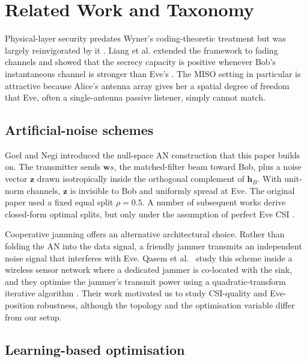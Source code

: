 \documentclass[conference]{IEEEtran}
\begin{document}
\section{Related Work and Taxonomy}\label{sec:related}

Physical-layer security predates Wyner's coding-theoretic treatment but
was largely reinvigorated by it \cite{wyner1975wiretap}. Liang et al.
extended the framework to fading channels and showed that the secrecy
capacity is positive whenever Bob's instantaneous channel is stronger
than Eve's \cite{liang2008secure}. The MISO setting in particular is
attractive because Alice's antenna array gives her a spatial degree of
freedom that Eve, often a single-antenna passive listener, simply
cannot match.

\subsection{Artificial-noise schemes}

Goel and Negi \cite{goel2008guaranteeing} introduced the null-space AN
construction that this paper builds on. The transmitter sends
$\mathbf{w} s$, the matched-filter beam toward Bob, plus a noise vector
$\mathbf{z}$ drawn isotropically inside the orthogonal complement of
$\mathbf{h}_B$. With unit-norm channels, $\mathbf{z}$ is invisible to
Bob and uniformly spread at Eve. The original paper used a fixed equal
split $\rho = 0.5$. A number of subsequent works derive closed-form
optimal splits, but only under the assumption of perfect Eve CSI
\cite{wang2019survey}.

Cooperative jamming offers an alternative architectural choice. Rather
than folding the AN into the data signal, a friendly jammer transmits
an independent noise signal that interferes with Eve. Qasem et al.\
\cite{qasem2024pls} study this scheme inside a wireless sensor network
where a dedicated jammer is co-located with the sink, and they
optimise the jammer's transmit power using a quadratic-transform
iterative algorithm \cite{shen2018fractional}. Their work motivated us
to study CSI-quality and Eve-position robustness, although the topology
and the optimisation variable differ from our setup.

\subsection{Learning-based optimisation}
\end{document}
